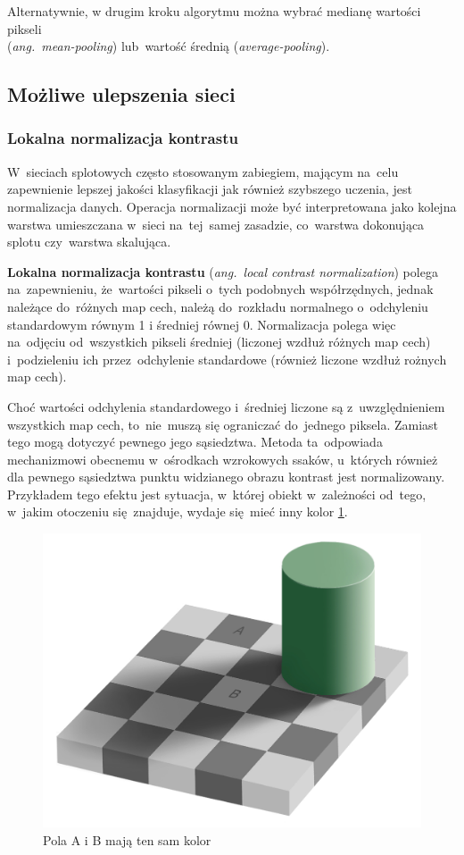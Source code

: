 Alternatywnie, w drugim kroku algorytmu można wybrać medianę wartości pikseli\\
(\textit{ang.~mean-pooling}) lub~wartość średnią (\textit{average-pooling}).

\subsection{Możliwe ulepszenia sieci}
\subsubsection{Lokalna normalizacja kontrastu}
W~sieciach splotowych często stosowanym zabiegiem, mającym na~celu zapewnienie lepszej jakości klasyfikacji jak również
szybszego uczenia, jest normalizacja danych. Operacja normalizacji może być interpretowana jako kolejna warstwa
umieszczana w~sieci na~tej~samej zasadzie, co~warstwa dokonująca splotu czy~warstwa skalująca.

\textbf{Lokalna normalizacja kontrastu}\cite{HOG} (\textit{ang.~local contrast normalization}) polega na~zapewnieniu,
że~wartości pikseli o~tych podobnych współrzędnych, jednak należące do~różnych map cech, należą do~rozkładu normalnego
o~odchyleniu standardowym równym 1 i średniej równej 0. Normalizacja polega więc na~odjęciu od~wszystkich pikseli
średniej (liczonej wzdłuż różnych map cech) i~podzieleniu ich przez~odchylenie standardowe (również liczone wzdłuż
rożnych map cech).

Choć wartości odchylenia standardowego i~średniej liczone są z~uwzględnieniem wszystkich map cech, to~nie~muszą
się ograniczać do~jednego piksela. Zamiast tego mogą dotyczyć pewnego jego sąsiedztwa. Metoda ta~odpowiada
mechanizmowi obecnemu w~ośrodkach wzrokowych ssaków, u~których również dla pewnego sąsiedztwa punktu widzianego
obrazu kontrast jest normalizowany. Przykładem tego efektu jest sytuacja, w~której obiekt w~zależności od~tego,
w~jakim otoczeniu się~znajduje, wydaje się~mieć inny kolor \ref{img:chess-illusion}.

\begin{figure}[H]
	\centering
	\includegraphics[width=0.8\linewidth]{img/chess-illusion.png}
	\caption{Pola A i B mają ten sam kolor}
	\label{img:chess-illusion}
\end{figure}

